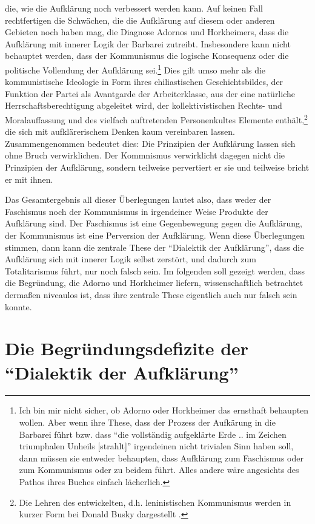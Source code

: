 \documentclass[12pt,a4paper,ngerman]{article}
\begin{document}
die, wie die Aufklärung noch verbessert werden kann. Auf keinen Fall
rechtfertigen die Schwächen, die die Aufklärung auf diesem oder
anderen Gebieten noch haben mag, die Diagnose Adornos und Horkheimers,
dass die Aufklärung mit innerer Logik der Barbarei zutreibt.
Insbesondere kann nicht behauptet werden, dass der Kommunismus die
logische Konsequenz oder die politische Vollendung der Aufklärung
sei.\footnote{Ich bin mir nicht sicher, ob Adorno oder Horkheimer das
  ernsthaft behaupten wollen. Aber wenn ihre These, dass der Prozess
  der Aufkärung in die Barbarei führt bzw. dass "`die vollständig
  aufgeklärte Erde .. im Zeichen triumphalen Unheils [strahlt]"'
  irgendeinen nicht trivialen Sinn haben soll, dann müssen sie
  entweder behaupten, dass Aufklärung zum Faschismus oder zum
  Kommunismus oder zu beidem führt. Alles andere wäre angesichts des
  Pathos ihres Buches einfach lächerlich.}  Dies gilt umso mehr als
die kommunistische Ideologie in Form ihres chiliastischen
Geschichtsbildes, der Funktion der Partei als Avantgarde der
Arbeiterklasse, aus der eine natürliche Herrschaftsberechtigung
abgeleitet wird, der kollektivistischen Rechts- und Moralauffassung
und des vielfach auftretenden Personenkultes Elemente
enthält,\footnote{Die Lehren des entwickelten, d.h.  leninistischen
  Kommunismus werden in kurzer Form bei Donald Busky dargestellt
  \cite[S. 163ff.]{busky:2002}.} die sich mit aufklärerischem Denken
kaum vereinbaren lassen. Zusammengenommen bedeutet dies: Die
Prinzipien der Aufklärung lassen sich ohne Bruch verwirklichen. Der
Kommnismus verwirklicht dagegen nicht die Prinzipien der Aufklärung,
sondern teilweise pervertiert er sie und teilweise bricht er mit
ihnen.

Das Gesamtergebnis all dieser Überlegungen lautet also, dass weder der
Faschismus noch der Kommunismus in irgendeiner Weise Produkte der Aufklärung
sind. Der Faschismus ist eine Gegenbewegung gegen die Aufklärung, der
Kommunismus ist eine Perversion der Aufklärung. Wenn diese Überlegungen
stimmen, dann kann die zentrale These der "`Dialektik der Aufklärung"', dass
die Aufklärung sich mit innerer Logik selbst zerstört, und dadurch zum
Totalitarismus führt, nur noch falsch sein. Im folgenden soll gezeigt werden,
dass die Begründung, die Adorno und Horkheimer liefern, wissenschaftlich
betrachtet dermaßen niveaulos ist, dass ihre zentrale These eigentlich auch
nur falsch sein konnte.

\section{Die Begründungsdefizite der "`Dialektik der Aufklärung"'}
\label{Kritik}
\end{document}

